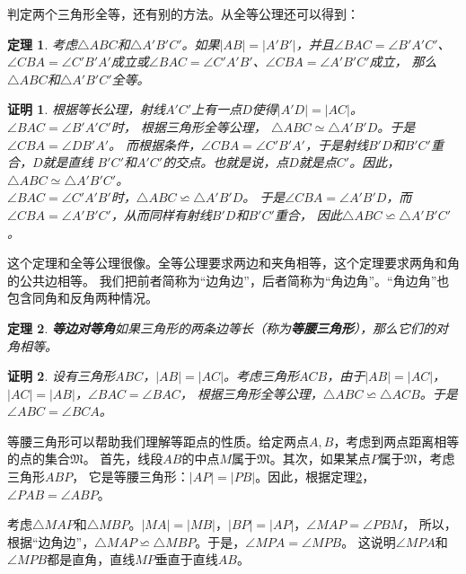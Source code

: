 \documentclass[12pt,UTF8]{ctexbook}
\newtheorem{tm}{定理}[section]
\newtheorem*{proof2}{证明}
\begin{document}
判定两个三角形全等，还有别的方法。从全等公理还可以得到：
\begin{tm}\label{tm:3-0-0}
    考虑$\triangle ABC$和$\triangle A'B'C'$。如果$|AB| = |A'B'|$，并且$\angle BAC = \angle B'A'C'$、
    $\angle CBA = \angle C'B'A'$成立或$\angle BAC = \angle C'A'B'$、$\angle CBA = \angle A'B'C'$成立，
    那么$\triangle ABC$和$\triangle A'B'C'$全等。    
\end{tm}
\begin{proof2}
    根据等长公理，射线$A'C'$上有一点$D$使得$|A'D| = |AC|$。$\angle BAC = \angle B'A'C'$时，
    根据三角形全等公理，
    $\triangle ABC \simeq \triangle A'B'D$。于是$\angle CBA = \angle DB'A'$。
    而根据条件，$\angle CBA = \angle C'B'A'$，于是射线$B'D$和$B'C'$重合，$D$就是直线
    $B'C'$和$A'C'$的交点。也就是说，点$D$就是点$C'$。因此，
    $\triangle ABC \simeq \triangle A'B'C'$。\\
    $\angle BAC = \angle C'A'B'$时，$\triangle ABC \backsimeq \triangle A'B'D$。
    于是$\angle CBA = \angle A'B'D$，而$\angle CBA = \angle A'B'C'$，从而同样有射线$B'D$和$B'C'$重合，
    因此$\triangle ABC \backsimeq \triangle A'B'C'$。
\end{proof2}
这个定理和全等公理很像。全等公理要求两边和夹角相等，这个定理要求两角和角的公共边相等。
我们把前者简称为“边角边”，后者简称为“角边角”。“角边角”也包含同角和反角两种情况。

\begin{tm}{\textbf{等边对等角}}\label{tm:3-0-1}
    如果三角形的两条边等长（称为\textbf{等腰三角形}），那么它们的对角相等。
\end{tm}
\begin{proof2}
    设有三角形$ABC$，$|AB|=|AC|$。考虑三角形$ACB$，由于$|AB|=|AC|$，$|AC|=|AB|$，$\angle BAC = \angle BAC$，
    根据三角形全等公理，$\triangle ABC \backsimeq \triangle ACB$。于是$\angle ABC = \angle BCA$。
\end{proof2}

等腰三角形可以帮助我们理解等距点的性质。给定两点$A,B$，考虑到两点距离相等的点的集合$\mathfrak{M}$。
首先，线段$AB$的中点$M$属于$\mathfrak{M}$。其次，如果某点$P$属于$\mathfrak{M}$，考虑三角形$ABP$，
它是等腰三角形：$|AP|=|PB|$。因此，根据定理\ref{tm:3-0-1}，$\angle PAB = \angle ABP$。

考虑$\triangle MAP$和$\triangle MBP$。$|MA| = |MB|$，$|BP| = |AP|$，$\angle MAP = \angle PBM$，
所以，根据“边角边”，$\triangle MAP \backsimeq \triangle MBP$。于是，$\angle MPA = \angle MPB$。
这说明$\angle MPA$和$\angle MPB$都是直角，直线$MP$垂直于直线$AB$。
\end{document}

